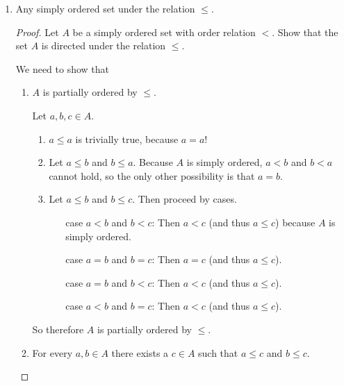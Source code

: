\documentclass[12pt]{article}
\begin{document}
\begin{enumerate}
    \item Any simply ordered set under the relation $\leq$.
          \begin{proof}
              Let $A$ be a simply ordered set with order relation $<$. Show that the set $A$ is directed under the relation $\leq$.

              We need to show that
              \begin{enumerate}
                  \item\label{pf:part-order} $A$ is partially ordered by $\leq$.

                        Let $a, b, c \in A$.
                        \begin{enumerate}
                            \item $a \leq a$ is trivially true, because $a = a$!
                            \item Let $a \leq b$ and $b \leq a$. Because $A$ is simply ordered, $a < b$ and $b < a$ cannot hold, so the only other possibility is that $a = b$.
                            \item Let $a \leq b$ and $b \leq c$. Then proceed by cases.
                                  \begin{itemize}
                                      \item[case $a < b$ and $b < c$:] Then $a < c$ (and thus $a \leq c$) because $A$ is simply ordered.
                                      \item[case $a = b$ and $b = c$:] Then $a = c$ (and thus $a \leq c$).
                                      \item[case $a = b$ and $b < c$:] Then $a < c$ (and thus $a \leq c$).
                                      \item[case $a < b$ and $b = c$:] Then $a < c$ (and thus $a \leq c$).
                                  \end{itemize}
                        \end{enumerate}
                        So therefore $A$ is partially ordered by $\leq$.
                  \item\label{pf:part-directed} For every $a, b \in A$ there exists a $c \in A$ such that $a \leq c$ and $b \leq c$.


\end{enumerate}
\end{proof}
\end{enumerate}
\end{document}
